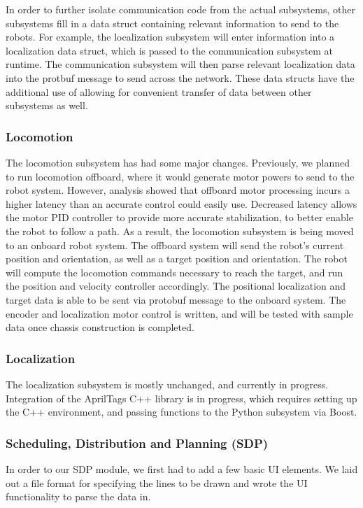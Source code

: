 In order to further isolate communication code from the actual subsystems, other subsystems fill in a data struct containing relevant information to send to the robots. For example, the localization subsystem will enter information into a localization data struct, which is passed to the communication subsystem at runtime. The communication subsystem will then parse relevant localization data into the protbuf message to send across the network. These data structs have the additional use of allowing for convenient transfer of data between other subsystems as well.

\subsubsection{Locomotion}
The locomotion subsystem has had some major changes. Previously, we planned to run locomotion offboard, where it would generate motor powers to send to the robot system. However, analysis showed that offboard motor processing incurs a higher latency than an accurate control could easily use. Decreased latency allows the motor PID controller to provide more accurate stabilization, to better enable the robot to follow a path. As a result, the locomotion subsystem is being moved to an onboard robot system. The offboard system will send the robot's current position and orientation, as well as a target position and orientation. The robot will compute the locomotion commands necessary to reach the target, and run the position and velocity controller accordingly. The positional localization and target data is able to be sent via protobuf message to the onboard system. The encoder and localization motor control is written, and will be tested with sample data once chassis construction is completed.

\subsubsection{Localization}
The localization subsystem is mostly unchanged, and currently in progress. Integration of the AprilTags C++ library is in progress, which requires setting up the C++ environment, and passing functions to the Python subsystem via Boost.

\subsubsection{Scheduling, Distribution and Planning (SDP)}

In order to our SDP module, we first had to add a few basic UI elements. We laid out a file format for specifying the lines to be drawn and wrote the UI functionality to parse the data in.

